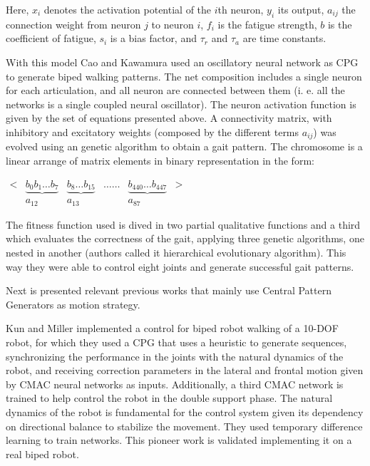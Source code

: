 Here, $x_i$ denotes the activation potential of the $i$th neuron, $y_i$ its output, $a_{ij}$ the connection weight from neuron $j$ to neuron $i$, $f_i$ is the fatigue strength, $b$ is the coefficient of fatigue, $s_i$ is a bias factor, and $\tau_r$ and $\tau_a$ are time constants.


With this model Cao and Kawamura used an oscillatory neural network as CPG to generate biped walking patterns. The net composition includes a single neuron for each articulation, and all neuron are connected between them (i. e. all the networks is a single coupled neural oscillator). The neuron activation function is given by the set of equations presented above. A connectivity matrix, with inhibitory and excitatory weights (composed by the different terms $a_{ij}$) was evolved using an genetic algorithm to obtain a gait pattern. The chromosome is a linear arrange of matrix elements in binary representation in the form:


\begin{center}
$\begin{array}{cccccc}
< & \underbrace{b_0b_1\dots b_7} & \underbrace{b_8\dots b_{15}} & \dots\dots & \underbrace{b_{440}\dots b_{447}} & > \\
 & a_{12} & a_{13} & & a_{87} & 
\end{array}$
\end{center}


The fitness function used is dived in two partial qualitative functions and a third which evaluates the correctness of the gait, applying three genetic algorithms, one nested in another (authors called it hierarchical evolutionary algorithm). This way they were able to control eight joints and generate successful gait patterns.
 

Next is presented relevant previous works that mainly use Central Pattern Generators as motion strategy.

Kun and Miller \cite{Kun96Adaptive} implemented a control for biped robot walking of a 10-DOF robot, for which they used a CPG that uses a heuristic to generate sequences, synchronizing the performance in the joints with the natural dynamics of the robot, and receiving correction parameters in the lateral and frontal motion given by CMAC neural networks as inputs. Additionally, a third CMAC network is trained to help control the robot in the double support phase. The natural dynamics of the robot is fundamental for the control system given its dependency on directional balance to stabilize the movement. They used temporary difference learning to train networks. This pioneer work is validated implementing it on a real biped robot. 


